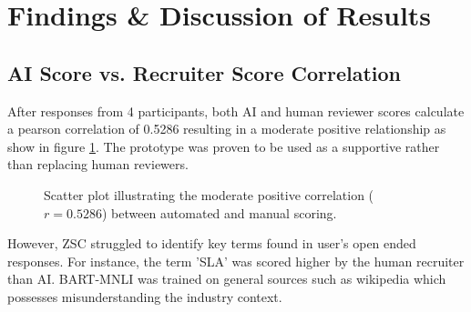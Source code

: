 \section{Findings \& Discussion of Results}
\label{sec:Fin}

\subsection{AI Score vs. Recruiter Score Correlation}
\par After responses from 4 participants, both AI and human reviewer scores calculate a pearson correlation of 0.5286 resulting in a moderate positive relationship as show in figure \ref{fig:correlation_plot}. The prototype was proven to be used as a supportive rather than replacing human reviewers. 

\begin{figure}[htbp]
    \centering
    \footnotesize \small
    \caption{Scatter plot illustrating the moderate positive correlation ($r = 0.5286$) between automated and manual scoring.}
    \label{fig:correlation_plot}
\end{figure}

\par However, ZSC struggled to identify key terms found in user's open ended responses. For instance, the term 'SLA' was scored higher by the human recruiter than AI. BART-MNLI was trained on general sources such as wikipedia which possesses misunderstanding the industry context.  

